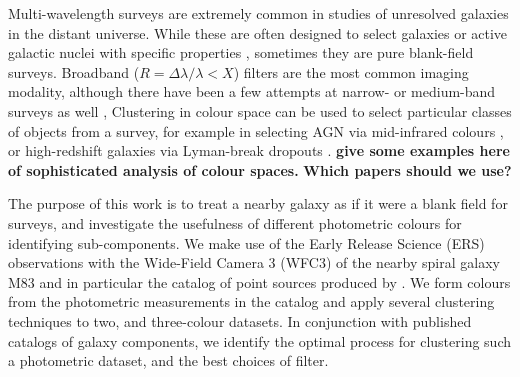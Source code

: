 Multi-wavelength surveys are extremely common in studies of unresolved galaxies in the distant universe.
While these are often designed to select galaxies or active galactic nuclei with specific properties \citep[e.g.][]{},
sometimes they are pure blank-field surveys.
Broadband ($R=\Delta \lambda/\lambda < X$) filters are the most common imaging modality,
although there have been a few attempts at narrow- or medium-band surveys as well \citep[e.g.][]{combo-17},
Clustering in colour space can be used to select particular classes of objects from a survey,
for example in selecting AGN via mid-infrared colours \citep[e.g.][]{},
or high-redshift galaxies via Lyman-break dropouts \citep[e.g.][]{}. 
{\bf give some examples here of sophisticated analysis of colour spaces.} \textbf{Which papers should we use?}

The purpose of this work is to treat a nearby galaxy as if it were a blank field for surveys, and investigate the
usefulness of different photometric colours for identifying sub-components.
We make use of the Early Release Science (ERS) observations with the Wide-Field Camera 3 (WFC3) of the nearby spiral galaxy M83 \citep{}
and in particular the catalog of point sources produced by \citet{}.
We form colours from the photometric measurements in the catalog and apply several clustering techniques to two, and three-colour datasets.
In conjunction with published catalogs of galaxy components, we identify the optimal process for clustering such a photometric dataset,
and the best choices of filter.




%
%
